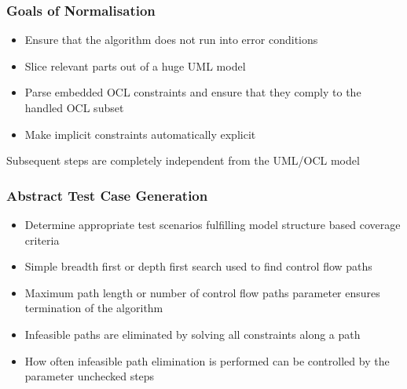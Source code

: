 \begin{frame}
\frametitle{Goals of Normalisation}
\begin{itemize}
  \item Ensure that the algorithm does not run into error conditions
  \item Slice relevant parts out of a huge UML model
  \item Parse embedded OCL constraints and ensure that they comply to the handled OCL subset
  \item Make implicit constraints automatically explicit
\end{itemize}
\begin{block}{}
Subsequent steps are completely independent from the UML/OCL model
\end{block}
\end{frame}

\begin{frame}
\frametitle{Abstract Test Case Generation}
\begin{itemize} 
\item Determine appropriate test scenarios fulfilling model structure based coverage criteria
\item Simple breadth first or depth first search used to find control flow paths
\item Maximum path length or number of control flow paths parameter ensures termination of the algorithm
\item Infeasible paths are eliminated by solving all constraints along a path
\item How often infeasible path elimination is performed can be controlled by the parameter unchecked steps
\end{itemize}
\end{frame} 



